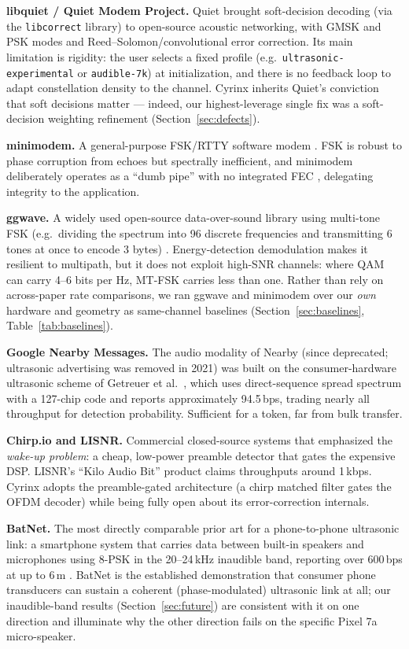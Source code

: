 \documentclass[11pt]{article}
\begin{document}
\textbf{libquiet / Quiet Modem Project.} Quiet \cite{quiet,quiethow} brought
soft-decision decoding (via the \texttt{libcorrect} library) to open-source
acoustic networking, with GMSK and PSK modes and Reed--Solomon/convolutional
error correction. Its main limitation is rigidity: the user selects a fixed
profile (e.g.\ \texttt{ultrasonic-experimental} or \texttt{audible-7k}) at
initialization, and there is no feedback loop to adapt constellation density
to the channel. Cyrinx inherits Quiet's conviction that soft decisions matter
--- indeed, our highest-leverage single fix was a soft-decision weighting
refinement (Section~\ref{sec:defects}).

\textbf{minimodem.} A general-purpose FSK/RTTY software modem
\cite{minimodem}. FSK is robust to phase corruption from echoes but spectrally
inefficient, and minimodem deliberately operates as a ``dumb pipe'' with no
integrated FEC \cite{minimodemissue}, delegating integrity to the application.

\textbf{ggwave.} A widely used open-source data-over-sound library using
multi-tone FSK (e.g.\ dividing the spectrum into 96 discrete frequencies and
transmitting 6 tones at once to encode 3 bytes) \cite{ggwave}. Energy-detection
demodulation makes it resilient to multipath, but it does not exploit
high-SNR channels: where QAM can carry 4--6 bits per Hz, MT-FSK carries less
than one. Rather than rely on across-paper rate comparisons, we ran ggwave and
minimodem over our \emph{own} hardware and geometry as same-channel baselines
(Section~\ref{sec:baselines}, Table~\ref{tab:baselines}).

\textbf{Google Nearby Messages.} The audio modality of Nearby \cite{nearby}
(since deprecated; ultrasonic advertising was removed in 2021) was built on the
consumer-hardware ultrasonic scheme of Getreuer et al.\ \cite{researchgate},
which uses direct-sequence spread spectrum with a 127-chip code and reports
approximately 94.5\,bps, trading nearly all throughput for detection
probability. Sufficient for a token, far from bulk transfer.

\textbf{Chirp.io and LISNR.} Commercial closed-source systems
\cite{chirp,lisnr} that emphasized the \emph{wake-up problem}: a cheap,
low-power preamble detector that gates the expensive DSP. LISNR's ``Kilo Audio
Bit'' product claims throughputs around 1\,kbps. Cyrinx adopts the
preamble-gated architecture (a chirp matched filter gates the OFDM decoder)
while being fully open about its error-correction internals.

\textbf{BatNet.} The most directly comparable prior art for a phone-to-phone
ultrasonic link: a smartphone system that carries data between built-in
speakers and microphones using 8-PSK in the 20--24\,kHz inaudible band,
reporting over 600\,bps at up to 6\,m \cite{batnet}. BatNet is the established
demonstration that consumer phone transducers can sustain a coherent
(phase-modulated) ultrasonic link at all; our inaudible-band results
(Section~\ref{sec:future}) are consistent with it on one direction and
illuminate why the other direction fails on the specific Pixel 7a micro-speaker.
\end{document}
